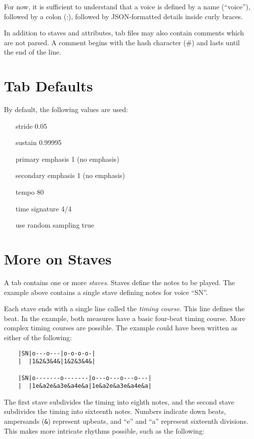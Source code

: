 \documentclass{article}
\begin{document}
For now, it is sufficient to understand that a voice is defined by a name
(``voice''), followed by a colon (:), followed by JSON-formatted details inside
curly braces.

In addition to staves and attributes, tab files may also contain comments
which are not parsed.  A comment begins with the hash character (\#) and lasts
until the end of the line.

\section*{Tab Defaults}

By default, the following values are used:

\begin{itemize}
\item[stride] 0.05
\item[sustain] 0.99995
\item[primary emphasis] 1 (no emphasis)
\item[secondary emphasis] 1 (no emphasis)
\item[tempo] 80
\item[time signature] 4/4
\item[use random sampling] true
\end{itemize}

\section*{More on Staves}

A tab contains one or more {\it staves}.  Staves define the notes to be
played.  The example above contains a single stave defining notes for voice
``SN''.

Each stave ends with a single line called the {\it timing course}.  This line
defines the beat.  In the example, both measures have a basic four-beat timing
course.  More complex timing courses are possible.  The example could have been
written as either of the following:

\begin{verbatim}
    |SN|o---o---|o-o-o-o-|
    |  |1&2&3&4&|1&2&3&4&|
    
    |SN|o-------o-------|o---o---o---o---|
    |  |1e&a2e&a3e&a4e&a|1e&a2e&a3e&a4e&a|
\end{verbatim}

The first stave subdivides the timing into eighth notes, and the second stave
subdivides the timing into sixteenth notes.  Numbers indicate down beats,
ampersands (\verb!&!) represent upbeats, and ``e'' and ``a'' represent sixteenth
divisions.  This makes more intricate rhythms possible, such as the following:
\end{document}
